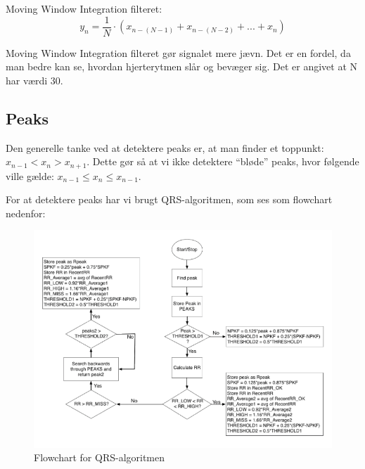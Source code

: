 \documentclass{article}
\begin{document}
Moving Window Integration filteret:
$$y_n=\frac{1}{N}\cdot(x_{n-(N-1)}+x_{n-(N-2)}+...+x_n)$$

Moving Window Integration filteret gør signalet mere jævn. Det er en fordel, da man bedre kan se, hvordan hjerterytmen slår og bevæger sig. Det er angivet at N har værdi 30.

\subsection{Peaks}
Den generelle tanke ved at detektere peaks er, at man finder et toppunkt: $x_{n-1} < x_n > x_{n+1}$. Dette gør så at vi ikke detektere “bløde” peaks, hvor følgende ville gælde: $x_{n-1} \leq x_n \leq x_{n-1}$.

For at detektere peaks har vi brugt QRS-algoritmen, som ses som flowchart nedenfor:
\begin{figure}[h]
	\centering
	\includegraphics[scale=0.5]{QRS-diagram.png}
	\caption{Flowchart for QRS-algoritmen}
\end{figure}
\end{document}
